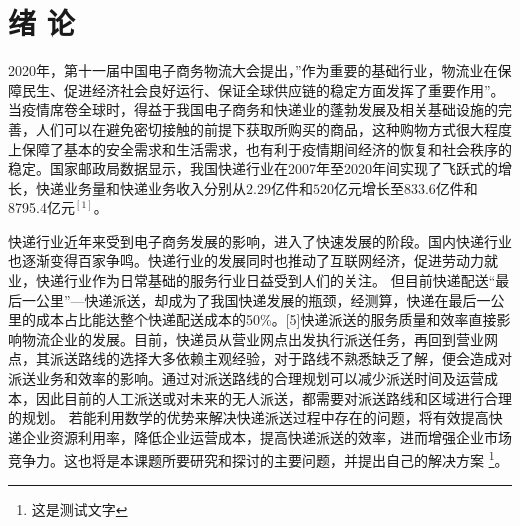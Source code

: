 \clearpage
{}
\setcounter{page}{1}
\section{绪 \quad 论}
\songti{}
\setlength{\baselineskip}{20pt}
\par 2020年，第十一届中国电子商务物流大会提出，”作为重要的基础行业，物流业在保障民生、促进经济社会良好运行、保证全球供应链的稳定方面发挥了重要作用”。当疫情席卷全球时，得益于我国电子商务和快递业的蓬勃发展及相关基础设施的完善，人们可以在避免密切接触的前提下获取所购买的商品，这种购物方式很大程度上保障了基本的安全需求和生活需求，也有利于疫情期间经济的恢复和社会秩序的稳定。国家邮政局数据显示，我国快递行业在2007年至2020年间实现了飞跃式的增长，快递业务量和快递业务收入分别从$2.29$亿件和$520$亿元增长至833.6亿件和8795.4亿元$^{[1]}$。
\par 快递行业近年来受到电子商务发展的影响，进入了快速发展的阶段。国内快递行业也逐渐变得百家争鸣。快递行业的发展同时也推动了互联网经济，促进劳动力就业，快递行业作为日常基础的服务行业日益受到人们的关注。 但目前快递配送“最后一公里”—快递派送，却成为了我国快递发展的瓶颈，经测算，快递在最后一公里的成本占比能达整个快递配送成本的50\%。[5]快递派送的服务质量和效率直接影响物流企业的发展。目前，快递员从营业网点出发执行派送任务，再回到营业网点，其派送路线的选择大多依赖主观经验，对于路线不熟悉缺乏了解，便会造成对派送业务和效率的影响。通过对派送路线的合理规划可以减少派送时间及运营成本，因此目前的人工派送或对未来的无人派送，都需要对派送路线和区域进行合理的规划。\cite{knuthwebsite} 若能利用数学的优势来解决快递派送过程中存在的问题，将有效提高快递企业资源利用率，降低企业运营成本，提高快递派送的效率，进而增强企业市场竞争力。这也将是本课题所要研究和探讨的主要问题，并提出自己的解决方案 \footnote{这是测试文字}。

